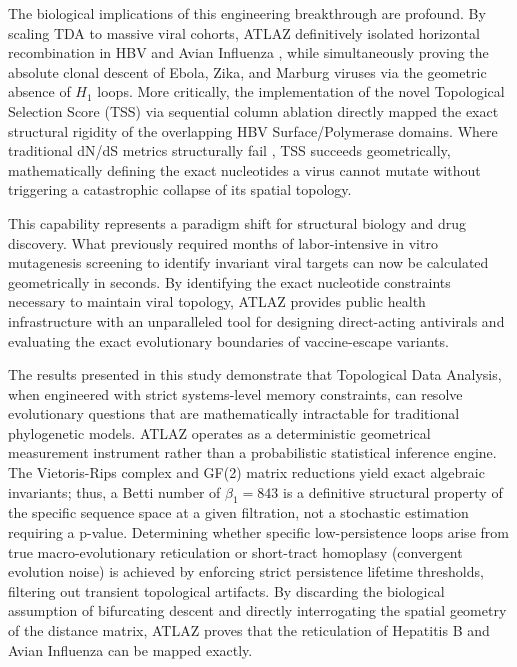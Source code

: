 The biological implications of this engineering breakthrough are profound. By scaling TDA to massive viral cohorts, ATLAZ definitively isolated horizontal recombination in HBV \citep{mcnaughton2019hbv} and Avian Influenza \citep{nelson2014emergence}, while simultaneously proving the absolute clonal descent of Ebola, Zika, and Marburg viruses \citep{kuiken2012lanl, bedford2016zika} via the geometric absence of $H_1$ loops. More critically, the implementation of the novel Topological Selection Score (TSS) via sequential column ablation directly mapped the exact structural rigidity of the overlapping HBV Surface/Polymerase domains. Where traditional dN/dS metrics structurally fail \citep{schlub2018estimating}, TSS succeeds geometrically, mathematically defining the exact nucleotides a virus cannot mutate without triggering a catastrophic collapse of its spatial topology. 

This capability represents a paradigm shift for structural biology and drug discovery. What previously required months of labor-intensive in vitro mutagenesis screening to identify invariant viral targets can now be calculated geometrically in seconds. By identifying the exact nucleotide constraints necessary to maintain viral topology, ATLAZ provides public health infrastructure with an unparalleled tool for designing direct-acting antivirals and evaluating the exact evolutionary boundaries of vaccine-escape variants. 

The results presented in this study demonstrate that Topological Data Analysis, when engineered with strict systems-level memory constraints, can resolve evolutionary questions that are mathematically intractable for traditional phylogenetic models. ATLAZ operates as a deterministic geometrical measurement instrument rather than a probabilistic statistical inference engine. The Vietoris-Rips complex and GF(2) matrix reductions yield exact algebraic invariants; thus, a Betti number of $\beta_1 = 843$ is a definitive structural property of the specific sequence space at a given filtration, not a stochastic estimation requiring a p-value. Determining whether specific low-persistence loops arise from true macro-evolutionary reticulation or short-tract homoplasy (convergent evolution noise) is achieved by enforcing strict persistence lifetime thresholds, filtering out transient topological artifacts. By discarding the biological assumption of bifurcating descent and directly interrogating the spatial geometry of the distance matrix, ATLAZ proves that the reticulation of Hepatitis B and Avian Influenza can be mapped exactly.

